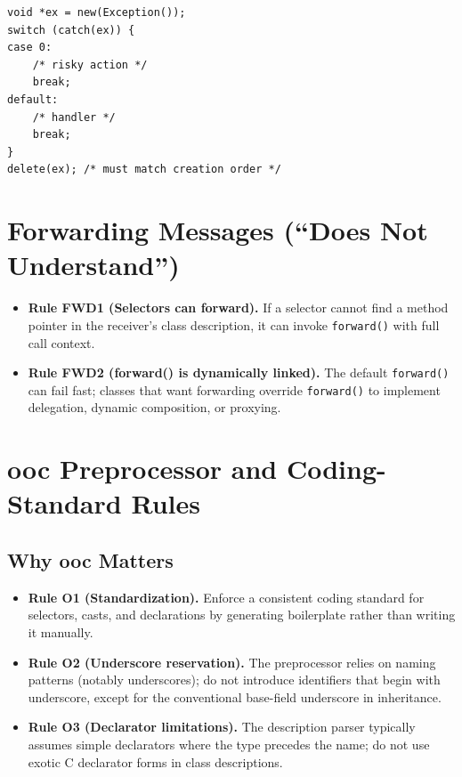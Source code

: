 \documentclass[11pt]{article}
\begin{document}
\begin{verbatim}
void *ex = new(Exception());
switch (catch(ex)) {
case 0:
    /* risky action */
    break;
default:
    /* handler */
    break;
}
delete(ex); /* must match creation order */
\end{verbatim}

\section{Forwarding Messages (``Does Not Understand'')}

\begin{itemize}
  \item \textbf{Rule FWD1 (Selectors can forward).} If a selector cannot find a method pointer in the receiver's class description, it can invoke \texttt{forward()} with full call context.
  \item \textbf{Rule FWD2 (forward() is dynamically linked).} The default \texttt{forward()} can fail fast; classes that want forwarding override \texttt{forward()} to implement delegation, dynamic composition, or proxying.
\end{itemize}

\section{ooc Preprocessor and Coding-Standard Rules}

\subsection{Why ooc Matters}

\begin{itemize}
  \item \textbf{Rule O1 (Standardization).} Enforce a consistent coding standard for selectors, casts, and declarations by generating boilerplate rather than writing it manually.
  \item \textbf{Rule O2 (Underscore reservation).} The preprocessor relies on naming patterns (notably underscores); do not introduce identifiers that begin with underscore, except for the conventional base-field underscore in inheritance.
  \item \textbf{Rule O3 (Declarator limitations).} The description parser typically assumes simple declarators where the type precedes the name; do not use exotic C declarator forms in class descriptions.
\end{itemize}
\end{document}
